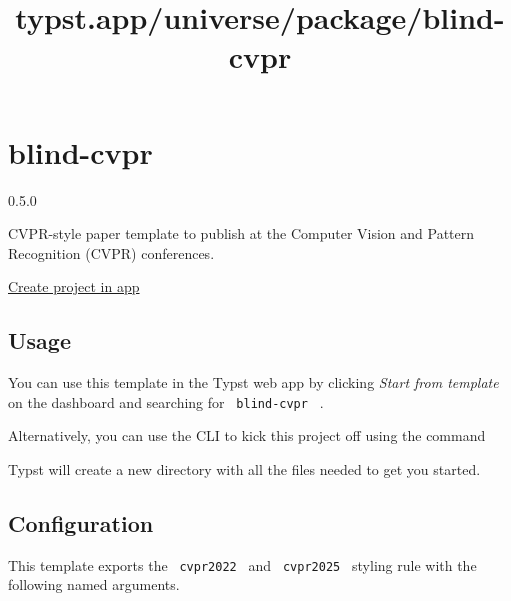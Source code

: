 \title{typst.app/universe/package/blind-cvpr}

\label{banner}
\label{template-thumbnail}

\section{blind-cvpr}\label{blind-cvpr}

{ 0.5.0 }

CVPR-style paper template to publish at the Computer Vision and Pattern
Recognition (CVPR) conferences.

\href{/app?template=blind-cvpr&version=0.5.0}{Create project in app}

\label{readme}
\subsection{Usage}\label{usage}

You can use this template in the Typst web app by clicking \emph{Start
from template} on the dashboard and searching for
\texttt{\ blind-cvpr\ } .

Alternatively, you can use the CLI to kick this project off using the
command

\begin{Shaded}
\begin{Highlighting}[]
\end{Highlighting}
\end{Shaded}

Typst will create a new directory with all the files needed to get you
started.

\subsection{Configuration}\label{configuration}

This template exports the \texttt{\ cvpr2022\ } and
\texttt{\ cvpr2025\ } styling rule with the following named arguments.


